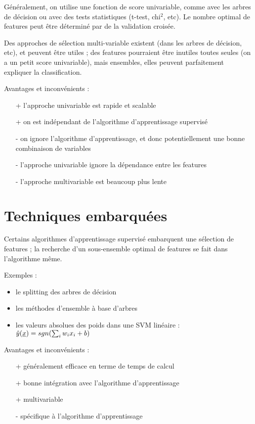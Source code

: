 	Généralement, on utilise une fonction de score univariable, comme avec les arbres de décision ou avec des tests statistiques (t-test, chi$^2$, etc). Le nombre optimal de features peut être déterminé par de la validation croisée.
	
	Des approches de sélection multi-variable existent (dans les arbres de décision, etc), et peuvent être utiles ; des features pourraient être inutiles toutes seules (on a un petit score univariable), mais ensembles, elles peuvent parfaitement expliquer la classification.
	
	
	Avantages et inconvénients :
	\begin{itemize}
		\item[+] l'approche univariable est rapide et scalable
		\item[+] on est indépendant de l'algorithme d'apprentissage supervisé
		\item[-] on ignore l'algorithme d'apprentissage, et donc potentiellement une bonne combinaison de variables
		\item[-] l'approche univariable ignore la dépendance entre les features
		\item[-] l'approche multivariable est beaucoup plus lente
	\end{itemize}
	
\section{Techniques embarquées}

Certains algorithmes d'apprentissage supervisé embarquent une sélection de features ; la recherche d'un sous-ensemble optimal de features se fait dans l'algorithme même.

Exemples :

\begin{itemize}
	\item le splitting des arbres de décision
	\item les méthodes d'ensemble à base d'arbres
	\item les valeurs absolues des poids dans une SVM linéaire : $\hat{y}(\underline{x}) = sgn(\sum_i w_i x_i + b)$
\end{itemize}

Avantages et inconvénients :
	
\begin{itemize}
	\item[+] généralement efficace en terme de temps de calcul
	\item[+] bonne intégration avec l'algorithme d'apprentissage
	\item[+] multivariable
	\item[-] spécifique à l'algorithme d'apprentissage
\end{itemize}

